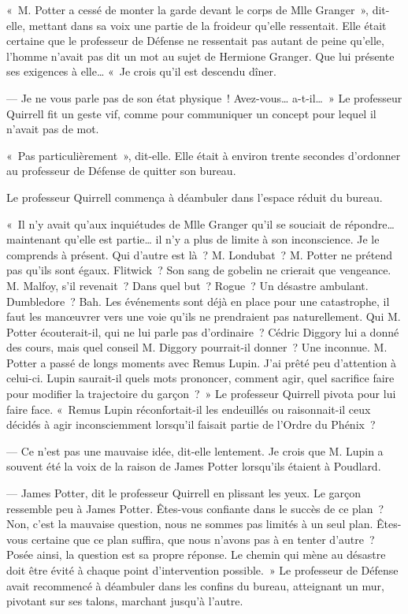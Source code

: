 «~M. Potter a cessé de monter la garde devant le corps de Mlle Granger~», dit-elle, mettant dans sa voix une partie de la froideur qu'elle ressentait. Elle était certaine que le professeur de Défense ne ressentait pas autant de peine qu'elle, l'homme n'avait pas dit un mot au sujet de Hermione Granger. Que lui présente ses exigences à elle… «~Je crois qu'il est descendu dîner.

--- Je ne vous parle pas de son état physique~! Avez-vous… a-t-il…~» Le professeur Quirrell fit un geste vif, comme pour communiquer un concept pour lequel il n'avait pas de mot.

«~Pas particulièrement~», dit-elle. Elle était à environ trente secondes d'ordonner au professeur de Défense de quitter son bureau.

Le professeur Quirrell commença à déambuler dans l'espace réduit du bureau.

«~Il n'y avait qu'aux inquiétudes de Mlle Granger qu'il se souciait de répondre… maintenant qu'elle est partie… il n'y a plus de limite à son inconscience. Je le comprends à présent. Qui d'autre est là~? M. Londubat~? M. Potter ne prétend pas qu'ils sont égaux. Flitwick~? Son sang de gobelin ne crierait que vengeance. M. Malfoy, s'il revenait~? Dans quel but~? Rogue~? Un désastre ambulant. Dumbledore~? Bah. Les événements sont déjà en place pour une catastrophe, il faut les manœuvrer vers une voie qu'ils ne prendraient pas naturellement. Qui M. Potter écouterait-il, qui ne lui parle pas d'ordinaire~? Cédric Diggory lui a donné des cours, mais quel conseil M. Diggory pourrait-il donner~? Une inconnue. M. Potter a passé de longs moments avec Remus Lupin. J'ai prêté peu d'attention à celui-ci. Lupin saurait-il quels mots prononcer, comment agir, quel sacrifice faire pour modifier la trajectoire du garçon~?~» Le professeur Quirrell pivota pour lui faire face. «~Remus Lupin réconfortait-il les endeuillés ou raisonnait-il ceux décidés à agir inconsciemment lorsqu'il faisait partie de l'Ordre du Phénix~?

--- Ce n'est pas une mauvaise idée, dit-elle lentement. Je crois que M. Lupin a souvent été la voix de la raison de James Potter lorsqu'ils étaient à Poudlard.

--- James Potter, dit le professeur Quirrell en plissant les yeux. Le garçon ressemble peu à James Potter. Êtes-vous confiante dans le succès de ce plan~? Non, c'est la mauvaise question, nous ne sommes pas limités à un seul plan. Êtes-vous certaine que ce plan suffira, que nous n'avons pas à en tenter d'autre~? Posée ainsi, la question est sa propre réponse. Le chemin qui mène au désastre doit être évité à chaque point d'intervention possible.~» Le professeur de Défense avait recommencé à déambuler dans les confins du bureau, atteignant un mur, pivotant sur ses talons, marchant jusqu'à l'autre.

